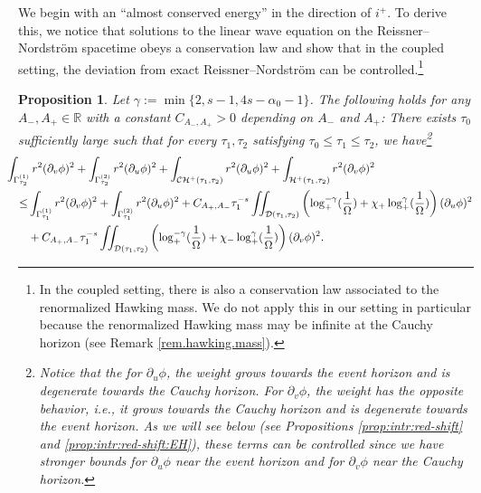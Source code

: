 \documentclass[10pt, reqno]{amsart}
\newtheorem{proposition}[theorem]{Proposition}
\theoremstyle{definition}
\theoremstyle{remark}
\numberwithin{equation}{section}
\newcommand{\rd}{\partial}
\newcommand{\0}{\emptyset}
\newcommand{\alp}{\alpha}
\newcommand{\Gmm}{\Gamma}
\newcommand{\Omg}{\Omega}
\newcommand{\calC}{\mathcal C}
\newcommand{\calD}{\mathcal D}
\newcommand{\calH}{\mathcal H}
\newcommand{\f}{\frac}
\newcommand{\CH}{\calC \calH^{+}}		%
\newcommand{\EH}{\calH^{+}}
\begin{document}
We begin with an ``almost conserved energy'' in the direction of $i^{+}$. To derive this, we notice that solutions to the linear wave equation on the Reissner--Nordstr\"om spacetime obeys a conservation law and show that in the coupled setting, the deviation from exact Reissner--Nordstr\"om can be controlled.\footnote{In the coupled setting, there is also a conservation law associated to the renormalized Hawking mass. We do not apply this in our setting in particular because the renormalized Hawking mass may be infinite at the Cauchy horizon (see Remark \ref{rem.hawking.mass}).}
\begin{proposition} \label{prop:intr:energy}
Let $\gamma:=\min\{2, s-1, 4s-\alp_0-1\}$. The following holds for any $A_-, A_+\in \mathbb R$ with a constant $C_{A_-,A_+}>0$ depending on $A_-$ and $A_+$: There exists $\tau_0$ sufficiently large such that for every $\tau_{1}, \tau_{2}$ satisfying $\tau_0 \leq \tau_{1} \leq \tau_{2}$, we have\footnote{Notice that the for $\rd_u\phi$, the weight grows towards the event horizon and is degenerate towards the Cauchy horizon. For $\rd_v\phi$, the weight has the opposite behavior, i.e., it grows towards the Cauchy horizon and is degenerate towards the event horizon. As we will see below (see Propositions \ref{prop:intr:red-shift} and \ref{prop:intr:red-shift:EH}), these terms can be controlled since we have stronger bounds for $\rd_u\phi$ near the event horizon and for $\rd_v\phi$ near the Cauchy horizon.}
\begin{equation} \label{eq:intr:energy}
\begin{aligned}
&\hskip-2em
	\int_{\Gmm_{\tau_{2}}^{(1)}} r^{2} (\rd_{v} \phi)^{2} + \int_{\Gmm_{\tau_{2}}^{(2)}} r^{2} (\rd_{u} \phi)^{2} 
	+ \int_{\CH(\tau_{1}, \tau_{2})} r^{2} (\rd_{u} \phi)^{2} + \int_{\EH(\tau_1,\tau_2)} r^{2} (\rd_{v} \phi)^{2} \\
	\leq & \int_{\Gmm^{(1)}_{\tau_{1}}} r^{2} (\rd_{v} \phi)^{2} + \int_{\Gmm^{(2)}_{\tau_{1}}} r^{2} (\rd_{u} \phi)^{2} +C_{A_+,A_-}\tau_1^{-s}\iint_{\calD(\tau_{1}, \tau_{2})} \left( \log_+^{-\gamma}(\f{1}{\Omg})+\chi_+\log_+^\gamma(\f{1}{\Omg}) \right)(\rd_u\phi)^2\\
	&+C_{A_+,A_-}\tau_1^{-s}\iint_{\calD(\tau_{1}, \tau_{2})}\left( \log_+^{-\gamma}(\f{1}{\Omg})+\chi_-\log_+^\gamma(\f{1}{\Omg}) \right)(\rd_v\phi)^2.
\end{aligned}
\end{equation}
\end{proposition}
\end{document}
